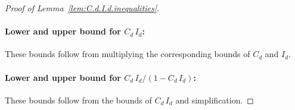 \documentclass[12pt]{article}
\begin{document}
\begin{appendix}
\begin{proof}[Proof of Lemma~\ref{lem:C.d.I.d.inequalities}]
\paragraph{Lower and upper bound for $C_d \, I_d$:} These bounds follow from multiplying the corresponding bounds of $C_d$ and $I_d$. 

\paragraph{Lower and upper bound for $C_d \, I_d / ( 1 - C_d \, I_d )$:} These bounds follow from the bounds of $C_d \, I_d$ and simplification.
\end{proof}

  

\end{appendix}
\end{document}
